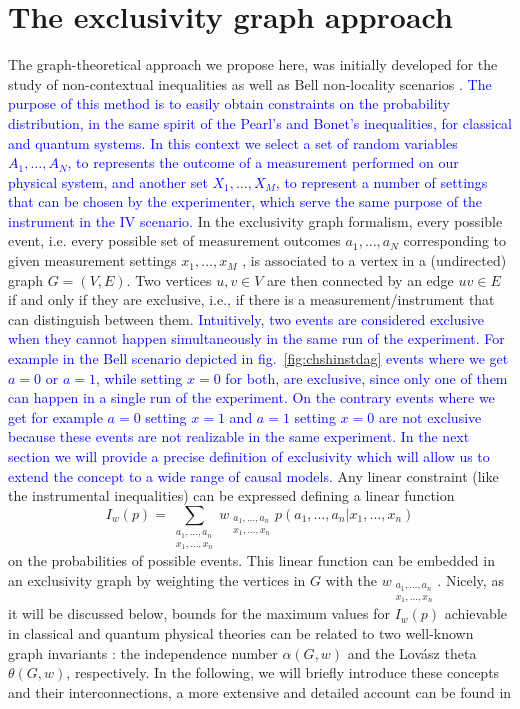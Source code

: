 \documentclass[letterpaper]{article}
\begin{document}
\section{The exclusivity graph approach}
The graph-theoretical approach we propose here, was initially developed for the
study of non-contextual inequalities \cite{cabello2014} as well as Bell
non-locality scenarios \cite{acin2015}. 
\textcolor{blue}{
The purpose of this method is to easily obtain constraints on the probability distribution, in the same spirit of the Pearl's
and Bonet's inequalities, for classical and quantum systems.
In this context we select a set of random variables $A_1,\ldots,A_N$, to represents 
the outcome of a measurement performed on our physical system,
and another set $X_1,\ldots,X_M$, to represent a number of settings that can be chosen by
 the experimenter, which serve the same purpose of the instrument in the IV scenario. 
}
In the exclusivity graph formalism, every possible event, i.e. every possible set of measurement
outcomes $a_1,\ldots, a_N$ corresponding to given measurement settings
$x_1,\ldots,x_M$ , is
associated to a vertex in a (undirected) graph $G = (V, E)$. 
Two vertices $u, v \in V$ are then connected by an edge $uv \in E$ if and only if they are
exclusive, i.e., if there is a measurement/instrument that can distinguish between
them. 
\textcolor{blue}{
Intuitively, two events are considered exclusive when they cannot happen simultaneously in the same run of
the experiment.
For example in the Bell scenario depicted in fig.~\ref{fig:chshinstdag} events where we get $a = 0$ or $a = 1$, while
setting $x = 0$ for both, are exclusive, since only one of them can happen in a single run of the experiment.
On the contrary events where we get for example $a = 0$ setting $x = 1$ and $a=1$ setting $x=0$ are not exclusive
because these events are not realizable in the same experiment.
In the next section we will provide a precise definition of exclusivity which will allow us to extend the concept
to a wide range of causal models.
}
Any linear constraint (like the instrumental inequalities) can be
expressed defining a linear function
\begin{equation}
    I_w(p) = \sum_{\substack{a_1,\ldots,a_n\\x_1,\ldots,x_n}}
w_{\substack{a_1,\ldots,a_n\\x_1,\ldots,x_n}} p(a_1,\ldots,a_n|x_1,\ldots,x_n)
\end{equation}
on the probabilities of possible events. 
This linear function can be embedded in an exclusivity graph by weighting the vertices in $G$ with the $w_{\substack{a_1,\ldots,a_n\\x_1,\ldots,x_n}}$. 
Nicely, as it will be discussed below, bounds for the maximum values for $I_w(p)$ achievable in classical and quantum
physical theories can be related to two well-known graph invariants \cite{cabello2014}: the
independence number $\alpha(G, w)$ and the Lovász theta $\theta(G, w)$,
respectively. In the following, we will briefly introduce these concepts and
their interconnections, a more extensive and detailed account can be found in
\cite{cabello2014,rabelo2014,acin2015}
\end{document}
